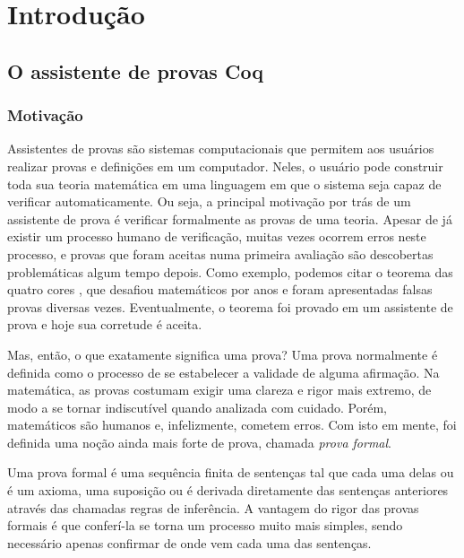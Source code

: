 \chapter{Introdução}

\section{O assistente de provas Coq} 
\subsection{Motivação}

Assistentes de provas são sistemas computacionais que permitem aos usuários
realizar provas e definições em um computador. Neles, o usuário pode construir
toda sua teoria matemática em uma linguagem em que o sistema seja capaz de
verificar automaticamente. Ou seja, a principal motivação por trás de um
assistente de prova é verificar formalmente as provas de uma teoria. Apesar de
já existir um processo humano de verificação, muitas vezes ocorrem erros neste
processo, e provas que foram aceitas numa primeira avaliação são descobertas
problemáticas algum tempo depois. Como exemplo, podemos citar o teorema das
quatro cores \cite{four_colour}, que desafiou matemáticos por anos e foram
apresentadas falsas provas diversas vezes. Eventualmente, o teorema foi provado
em um assistente de prova e hoje sua corretude é aceita.

Mas, então, o que exatamente significa uma prova? Uma prova normalmente é
definida como o processo de se estabelecer a validade de alguma afirmação. Na
matemática, as provas costumam exigir uma clareza e rigor mais extremo, de modo
a se tornar indiscutível quando analizada com cuidado. Porém, matemáticos são
humanos e, infelizmente, cometem erros. Com isto em mente, foi definida uma
noção ainda mais forte de prova, chamada \emph{prova formal}.

Uma prova formal é uma sequência finita de sentenças tal que cada uma delas ou é
um axioma, uma suposição ou é derivada diretamente das sentenças anteriores
através das chamadas regras de inferência. A vantagem do rigor das provas
formais é que conferí-la se torna um processo muito mais simples, sendo
necessário apenas confirmar de onde vem cada uma das sentenças.

